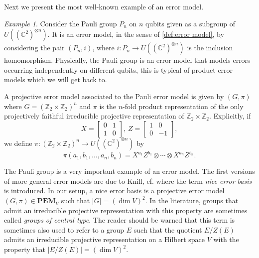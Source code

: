 \documentclass[11pt, oneside, reqno]{amsart}
\newcommand{\bbZ}{\mathbb{Z}}
\newcommand{\bbC}{\mathbb{C}}
\newcommand{\PEM}{\mathbf{PEM}}
\theoremstyle{definition}
\theoremstyle{plain}
\theoremstyle{remark}
\newtheorem{example}[definition]{Example}
\begin{document}
Next we present the most well-known example of an error model.

\begin{example}\label{ex:Pauli group}
    Consider the Pauli group $P_n$ on $n$ qubits given as a subgroup of $U((\bbC^2)^{\otimes n})$. It is an error model, in the sense of \cref{def:error model}, by considering the pair $(P_n,i)$, where $i \colon P_n \to U((\bbC^2)^{\otimes n})$ is the inclusion homomorphism. Physically, the Pauli group is an error model that models errors occurring independently on different qubits, this is typical of product error models which we will get back to.
    
    A projective error model associated to the Pauli error model is given by $(G,\pi)$ where $G = (\bbZ_2 \times \bbZ_2)^{n}$ and $\pi$ is the $n$-fold product representation of the only projectively faithful irreducible projective representation of $\bbZ_2 \times \bbZ_2$. Explicitly, if
    \begin{equation*}
        X =
        \begin{bmatrix}
            0 & 1 \\
            1 & 0
        \end{bmatrix}, \ 
        Z =
        \begin{bmatrix}
            1 & 0 \\
            0 & -1 
        \end{bmatrix},
    \end{equation*}
    we define $\pi \colon (\bbZ_2 \times \bbZ_2)^{n} \to U((\bbC^2)^{\otimes n})$ by
    \begin{equation*}
        \pi(a_1,b_1,\dots,a_n,b_n) = X^{a_1} Z^{b_1} \otimes \cdots \otimes X^{a_n}Z^{b_n}.
    \end{equation*}
\end{example}

The Pauli group is a very important example of an error model. The first versions of more general error models are due to Knill, cf. \cite{KnillI96,KnillII96} where the term \emph{nice error basis} is introduced. In our setup, a nice error basis is a projective error model $(G,\pi) \in \PEM_V$ such that $|G| = (\dim V)^2$. In the literature, groups that admit an irreducible projective representation with this property are sometimes called \emph{groups of central type}. The reader should be warned that this term is sometimes also used to refer to a group $E$ such that the quotient $E/Z(E)$ admits an irreducible projective representation on a Hilbert space $V$ with the property that $|E/Z(E)| = (\dim V)^2$.
\end{document}
